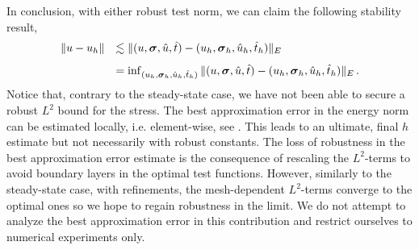 \documentclass{article}
\theoremstyle{definition}
\theoremstyle{remark}
\begin{document}
In conclusion, with either robust test norm, we can claim the following stability result,
$$
\begin{array}{ll}
\Vert u - u_h \Vert & \lesssim \Vert (u,\boldsymbol\sigma,\hat{u},\hat{t}) - (u_h,\boldsymbol\sigma_h,\hat{u}_h,\hat{t}_h) \Vert_E \\[8pt]
& = \inf_{(u_h,\boldsymbol\sigma_h,\hat{u}_h,\hat{t}_h)} \Vert (u,\boldsymbol\sigma,\hat{u},\hat{t}) - (u_h,\boldsymbol\sigma_h,\hat{u}_h,\hat{t}_h) \Vert_E \, .
\end{array}
$$
Notice that, contrary to the steady-state case, we have not been able to secure a robust $L^2$ bound
for the stress. The best approximation error in the energy norm can be estimated locally, i.e.
element-wise, see \cite{DemkowiczHeuer,ChanHeuerThanhDemkowicz2012}. This leads to an ultimate, final $h$ estimate but
not necessarily with robust constants. The loss of robustness in the best approximation error
estimate is the consequence of rescaling the $L^2$-terms to avoid boundary layers in the optimal
test functions. However, similarly to the steady-state case, with refinements, the mesh-dependent
$L^2$-terms converge to the optimal ones so we hope to regain robustness in the limit. 
We do not attempt to analyze the best approximation error in this contribution and restrict
ourselves to numerical experiments only.
\end{document}
